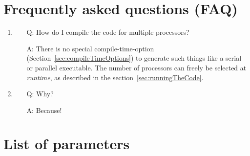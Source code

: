 \documentclass[a4paper, 11pt, DIV=11]{scrartcl}
\begin{document}
\section{Frequently asked questions (FAQ)}
\label{sec:faq}



\begin{enumerate}
\item 
\begin{itemize}
\item[Q:] How do I compile the code for multiple processors?
\item[A:] There is no special compile-time-option (Section~\ref{sec:compileTimeOptions}) to
generate such things like a serial or parallel executable. The number of processors can
freely be selected at \textit{runtime}, as described in the section~\ref{sec:runningTheCode}.
\end{itemize}

\item 
\begin{itemize}
\item[Q:] Why?
\item[A:] Because!
\end{itemize}

\end{enumerate}




\appendix



\section{List of parameters}
\label{sec:listOfParameters}
\end{document}
